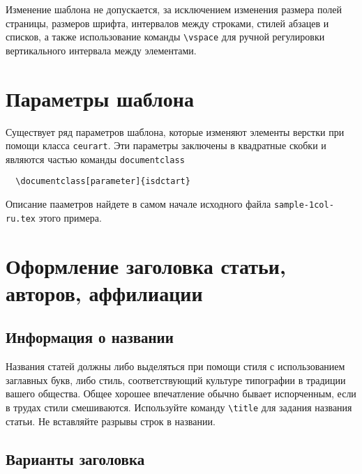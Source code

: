 \documentclass[
12pt,
polyglossia,   %
firacode,    %
wordmath,      %
russian        %
]{isdctart}
\begin{document}
Изменение шаблона не допускается, за исключением изменения размера полей страницы, размеров шрифта, интервалов между строками, стилей абзацев и списков, а также использование команды \verb|\vspace| для ручной регулировки вертикального интервала между элементами.

\section{Параметры шаблона}

Существует ряд параметров шаблона, которые изменяют элементы верстки при помощи класса \verb|ceurart|. Эти параметры заключены в квадратные скобки и являются частью команды {\verb|documentclass|}
\begin{verbatim}
  \documentclass[parameter]{isdctart}
\end{verbatim}

Описание пааметров найдете в самом начале исходного файла \verb|sample-1col-ru.tex| этого примера.


\section{Оформление заголовка статьи, авторов, аффилиации}

\subsection{Информация о названии}

Названия статей должны либо выделяться при помощи стиля с использованием заглавных букв, либо стиль, соответствующий культуре типографии в традиции вашего общества. Общее хорошее впечатление обычно бывает испорченным, если в трудах стили смешиваются.  Используйте команду \verb|\title| для задания названия статьи. Не вставляйте разрывы строк в названии.

\subsection{Варианты заголовка}
\end{document}
